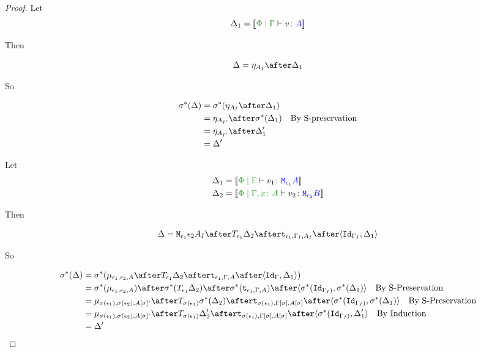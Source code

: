 \documentclass{report}
\begin{document}
\begin{framed}
\begin{proof}
    \case{\vreturn}
    Let \begin{equation}
        \D_1 = \deno{\gpetyperelation{v}{A}}
    \end{equation}
    
    Then
    
    \begin{equation}
        \D = \point{A_I}\after \D_1\\
    \end{equation}
    
    So
    
    \begin{align*}
        \si\star(\D) &= \si\star(\point{A_I}\after \D_1)\\
                & = \point{A_{I'}} \after\si\star(\D_1)\qt{By S-preservation}\\
                & = \point{A_{I'}} \after\D_1'\\
                & = \D'
    \end{align*}
    
    \case{\vbind}
    Let \begin{align*}
        \D_1 &= \deno{\gpetyperelation{v_1}{\M{\e_1}{A}}}\\
        \D_2 &= \deno{\etyperelation{\P}{\gax}{v_2}{\M{\e_2}{B}}}
    \end{align*}
    
    Then
    
    \begin{equation}
        \D = \M{\e_1}{\e_2}{A_I}\after\T{\e_1}{\D_2}\after\tstrength{\e_1}{\G_I}{A_I}\after\pr{\Id{\G_{I}}}{\D_1}\\
    \end{equation}
    
    So
    
    \begin{align*}
        \si\star(\D) &= \si\star(\bind{\e_1}{\e_2}{A}\after\T{\e_1}{\D_2}\after\tstrength{\e_1}{\G}{A}\after\pr{\Id{\G}}{\D_1})\\
        & = \si\star(\bind{\e_1}{\e_2}{A})\after\si\star(\T{\e_1}{\D_2})\after\si\star(\tstrength{\e_1}{\G}{A})\after\pr{\si\star(\Id{\G_{I})}}{\si\star(\D_1)}\qt{By S-Preservation}\\
        &= \bind{\si(\e_1)}{\si(\e_2)}{A\ssi'}\after\T{\si(\e_1)}{\si\star(\D_2)}\after\tstrength{\si(\e_1)}{\G\ssi}{A\ssi}\after\pr{\si\star(\Id{\G_{I})}}{\si\star(\D_1)}\qt{By S-Preservation}\\
        &= \bind{\si(\e_1)}{\si(\e_2)}{A\ssi'}\after\T{\si(\e_1)}{\D_2'}\after\tstrength{\si(\e_1)}{\G\ssi}{A\ssi}\after\pr{\si\star(\Id{\G_{I})}}{\D_1'}\qt{By Induction}\\
        &= \D'\\
    \end{align*}
    

\end{proof}
\end{framed}
\end{document}
